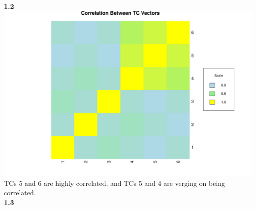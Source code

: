 \documentclass[11pt]{article}
\begin{document}
\textbf{1.2}\\
\includegraphics[scale=.35]{plots/corr_heatmap.pdf}\\
TCs 5 and 6 are highly correlated, and TCs 5 and 4 are verging on being correlated.\\
\textbf{1.3}\\
\end{document}
